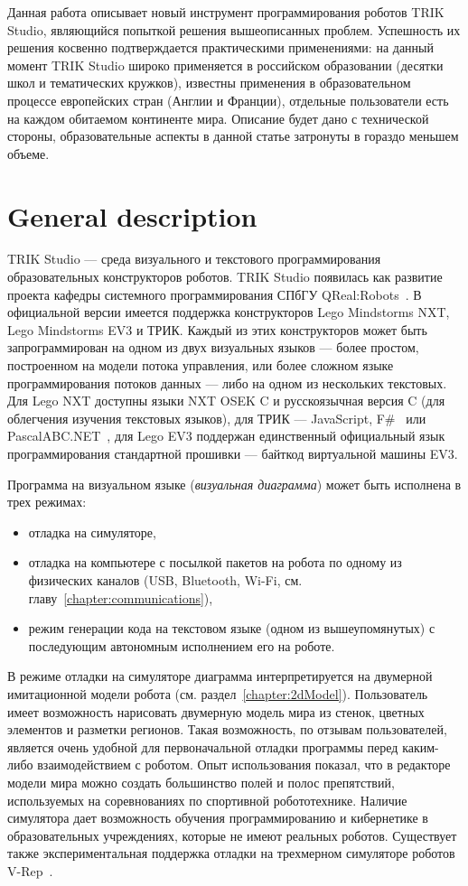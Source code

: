 \documentclass[conference]{IEEEtran}
\begin{document}
Данная работа описывает новый инструмент программирования роботов TRIK Studio, являющийся попыткой решения вышеописанных проблем. Успешность их решения косвенно подтверждается практическими применениями: на данный момент TRIK Studio широко применяется в российском образовании (десятки школ и тематических кружков), известны применения в образовательном процессе европейских стран (Англии и Франции), отдельные пользователи есть на каждом обитаемом континенте мира. Описание будет дано с технической стороны, образовательные аспекты в данной статье затронуты в гораздо меньшем объеме.

\section{General description}
\label{chapter:generalDescription}

TRIK Studio --- среда визуального и текстового программирования образовательных конструкторов роботов. TRIK Studio появилась как развитие проекта кафедры системного программирования СПбГУ QReal:Robots~\cite{terekhov2013sreda}. В официальной версии имеется поддержка конструкторов Lego Mindstorms NXT, Lego Mindstorms EV3 и ТРИК. Каждый из этих конструкторов может быть запрограммирован на одном из двух визуальных языков --- более простом, построенном на модели потока управления, или более сложном языке программирования потоков данных --- либо на одном из нескольких текстовых. Для Lego NXT доступны языки NXT OSEK C и русскоязычная версия C (для облегчения изучения текстовых языков), для ТРИК --- JavaScript, F\#~\cite{kirsanov2014robotics} или PascalABC.NET~\cite{doliner2014basics}, для Lego EV3 поддержан единственный официальный язык программирования стандартной прошивки --- байткод виртуальной машины EV3.

Программа на визуальном языке (\textit{визуальная диаграмма}) может быть исполнена в трех режимах: 
\begin{itemize}
    \item отладка на симуляторе,
    \item отладка на компьютере с посылкой пакетов на робота по одному из физических каналов (USB, Bluetooth, Wi-Fi, см. главу~\ref{chapter:communications}),
    \item режим генерации кода на текстовом языке (одном из вышеупомянутых) с последующим автономным исполнением его на роботе. 
\end{itemize}

В режиме отладки на симуляторе диаграмма интерпретируется на двумерной имитационной модели робота (см. раздел~\ref{chapter:2dModel}). Пользователь имеет возможность нарисовать двумерную модель мира из стенок, цветных элементов и разметки регионов. Такая возможность, по отзывам пользователей, является очень удобной для первоначальной отладки программы перед каким-либо взаимодействием с роботом. Опыт использования показал, что в редакторе модели мира можно создать большинство полей и полос препятствий, используемых на соревнованиях по спортивной робототехнике. Наличие симулятора дает возможность обучения программированию и кибернетике в образовательных учреждениях, которые не имеют реальных роботов. Существует также экспериментальная поддержка отладки на трехмерном симуляторе роботов V-Rep~\cite{rohmer2013v}.
\end{document}
